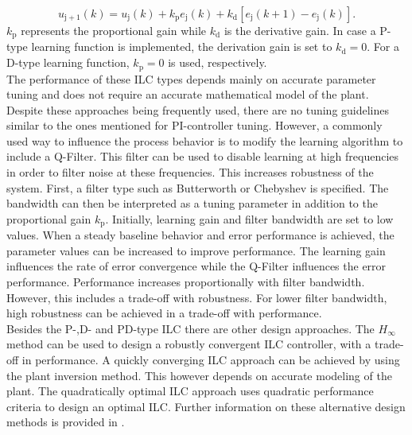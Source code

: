  \begin{equation}
     u_{\mathrm{j+1}}(k) = u_{\mathrm{j}}(k)+k_{\mathrm{p}}e_{\mathrm{j}}(k)+k_{\mathrm{d}}[e_{\mathrm{j}}(k+1)-e_{\mathrm{j}}(k)].
  \label{eq:PD_type_2}
  \end{equation}
$k_{\mathrm{p}}$ represents the proportional gain while $k_{\mathrm{d}}$ is the derivative gain. In case a P-type learning function is implemented, the derivation gain is set to $k_{\mathrm{d}}=0$. For a D-type learning function, $k_{\mathrm{p}}=0$ is used, respectively.
\\The performance of these ILC types depends mainly on accurate parameter tuning and does not require an accurate mathematical model of the plant. Despite these approaches being frequently used, there are no tuning guidelines similar to the ones mentioned for PI-controller tuning. However, a commonly used way to influence the process behavior is to modify the learning algorithm to include a Q-Filter. This filter can be used to disable learning at high frequencies in order to filter noise at these frequencies. This increases robustness of the system. First, a filter type such as Butterworth or Chebyshev is specified. The bandwidth can then be interpreted as a tuning parameter in addition to the proportional gain $k_{\mathrm{p}}$. Initially, learning gain and filter bandwidth are set to low values. When a steady baseline behavior and error performance is achieved, the parameter values can be increased to improve performance. The learning gain influences the rate of error convergence while the Q-Filter influences the error performance. Performance increases proportionally with filter bandwidth. However, this includes a trade-off with robustness. For lower filter bandwidth, high robustness can be achieved in a trade-off with performance.
\\Besides the P-,D- and PD-type ILC there are other design approaches. The $H_{\infty}$ method can be used to design a robustly convergent ILC controller, with a trade-off in performance. A quickly converging ILC approach can be achieved by using the plant inversion method. This however depends on accurate modeling of the plant. The quadratically optimal ILC approach uses quadratic performance criteria to design an optimal ILC. Further information on these alternative design methods is provided in \cite{ILC2}.
